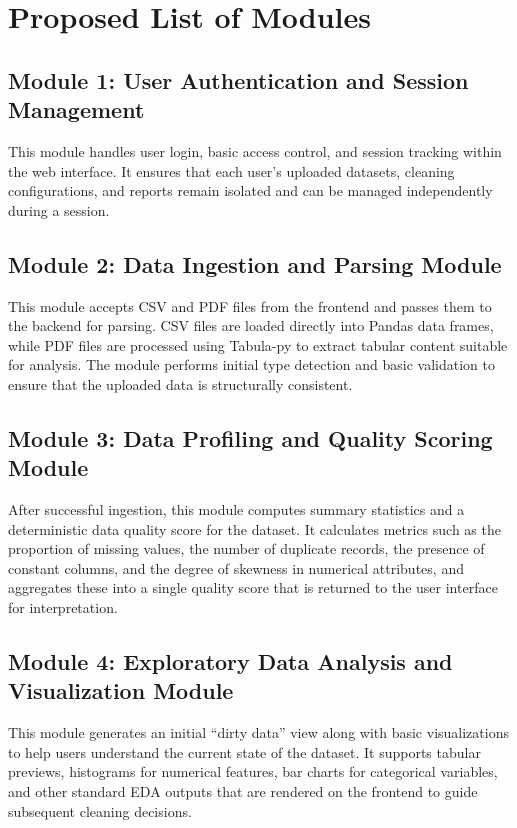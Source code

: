 \documentclass[conference]{IEEEtran}
\begin{document}
\section{Proposed List of Modules}

\subsection*{Module 1: User Authentication and Session Management}
This module handles user login, basic access control, and session tracking within the web interface. It ensures that each user's uploaded datasets, cleaning configurations, and reports remain isolated and can be managed independently during a session.

\subsection*{Module 2: Data Ingestion and Parsing Module}
This module accepts CSV and PDF files from the frontend and passes them to the backend for parsing. CSV files are loaded directly into Pandas data frames, while PDF files are processed using Tabula-py to extract tabular content suitable for analysis. The module performs initial type detection and basic validation to ensure that the uploaded data is structurally consistent.

\subsection*{Module 3: Data Profiling and Quality Scoring Module}
After successful ingestion, this module computes summary statistics and a deterministic data quality score for the dataset. It calculates metrics such as the proportion of missing values, the number of duplicate records, the presence of constant columns, and the degree of skewness in numerical attributes, and aggregates these into a single quality score that is returned to the user interface for interpretation.

\subsection*{Module 4: Exploratory Data Analysis and Visualization Module}
This module generates an initial ``dirty data'' view along with basic visualizations to help users understand the current state of the dataset. It supports tabular previews, histograms for numerical features, bar charts for categorical variables, and other standard EDA outputs that are rendered on the frontend to guide subsequent cleaning decisions.
\end{document}
